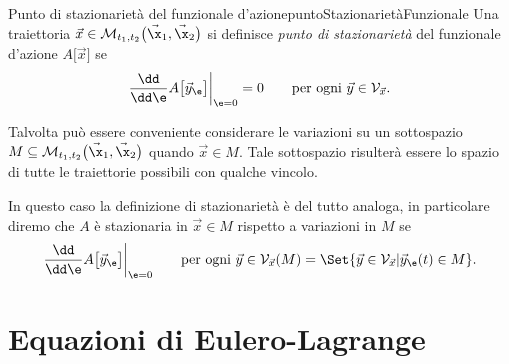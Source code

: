 \begin{defn}{Punto di stazionarietà del funzionale d'azione}{puntoStazionarietàFunzionale}
	Una traiettoria \(\vec{x}\in \mathcal{M}_{t_1,t_2}\big(\vec{\x}_1,\vec{\x}_2\big)\) si definisce \emph{punto di stazionarietà} del funzionale d'azione \(A\big[\vec{x}\big]\) se 
	\[
		\frac{\dd}{\dd\e}A\big[\vec{y}_\e\big]\bigg|_{\e = 0} = 0 \qquad\text{per ogni }\vec{y}\in \mathcal{V}_{\vec{x}}. 
	\]
\end{defn}

\begin{oss}
	Talvolta può essere conveniente considerare le variazioni su un sottospazio \(M\subseteq \mathcal{M}_{t_1,t_2}\big(\vec{\x}_1,\vec{\x}_2\big)\) quando \(\vec{x}\in M\).
	Tale sottospazio risulterà essere lo spazio di tutte le traiettorie possibili con qualche vincolo.
	
	In questo caso la definizione di stazionarietà è del tutto analoga, in particolare diremo che \(A\) è stazionaria in \(\vec{x}\in M\) rispetto a variazioni in \(M\) se
	\[
		\frac{\dd}{\dd\e} A\big[\vec{y}_\e\big] \bigg|_{\e = 0} \qquad\text{per ogni }\vec{y}\in \mathcal{V}_{\vec{x}}(M) = \Set{\vec{y}\in \mathcal{V}_{\vec{x}} | \vec{y}_\e(t) \in M}.
	\]
\end{oss}

\section{Equazioni di Eulero-Lagrange}

